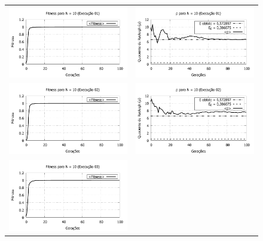 \newpage
\begin{figure}[p]
\centering
  \begin{tabular}{@{}cc@{}}
    \includegraphics[width=.45\textwidth]{figs/resultados/fitnessGrad/N10_01_fitness.pdf} &
    \includegraphics[width=.45\textwidth]{figs/resultados/fitnessGrad/N10_01_rho.pdf}   \\
		\includegraphics[width=.45\textwidth]{figs/resultados/fitnessGrad/N10_02_fitness.pdf} &
    \includegraphics[width=.45\textwidth]{figs/resultados/fitnessGrad/N10_02_rho.pdf}   \\
		\includegraphics[width=.45\textwidth]{figs/resultados/fitnessGrad/N10_03_fitness.pdf} &

\end{tabular}
\end{figure}
